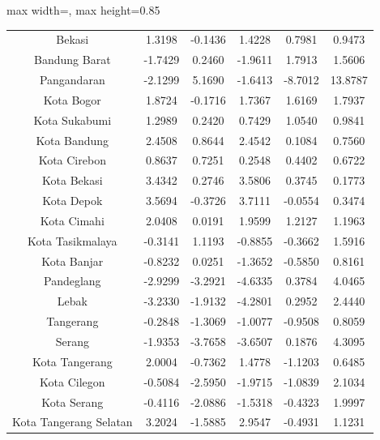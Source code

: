 \begin{table}[H]
\begin{adjustbox}{max width=\textwidth, max height=0.85\textheight}
\begin{tabular}{|c|c|c|c|c|c|}
Bekasi & 1.3198 & -0.1436 & 1.4228 & 0.7981 & 0.9473 \\
Bandung Barat & -1.7429 & 0.2460 & -1.9611 & 1.7913 & 1.5606 \\
Pangandaran & -2.1299 & 5.1690 & -1.6413 & -8.7012 & 13.8787 \\
Kota Bogor & 1.8724 & -0.1716 & 1.7367 & 1.6169 & 1.7937 \\
Kota Sukabumi & 1.2989 & 0.2420 & 0.7429 & 1.0540 & 0.9841 \\
Kota Bandung & 2.4508 & 0.8644 & 2.4542 & 0.1084 & 0.7560 \\
Kota Cirebon & 0.8637 & 0.7251 & 0.2548 & 0.4402 & 0.6722 \\
Kota Bekasi & 3.4342 & 0.2746 & 3.5806 & 0.3745 & 0.1773 \\
Kota Depok & 3.5694 & -0.3726 & 3.7111 & -0.0554 & 0.3474 \\
Kota Cimahi & 2.0408 & 0.0191 & 1.9599 & 1.2127 & 1.1963 \\
Kota Tasikmalaya & -0.3141 & 1.1193 & -0.8855 & -0.3662 & 1.5916 \\
Kota Banjar & -0.8232 & 0.0251 & -1.3652 & -0.5850 & 0.8161 \\
Pandeglang & -2.9299 & -3.2921 & -4.6335 & 0.3784 & 4.0465 \\
Lebak & -3.2330 & -1.9132 & -4.2801 & 0.2952 & 2.4440 \\
Tangerang & -0.2848 & -1.3069 & -1.0077 & -0.9508 & 0.8059 \\
Serang & -1.9353 & -3.7658 & -3.6507 & 0.1876 & 4.3095 \\
Kota Tangerang & 2.0004 & -0.7362 & 1.4778 & -1.1203 & 0.6485 \\
Kota Cilegon & -0.5084 & -2.5950 & -1.9715 & -1.0839 & 2.1034 \\
Kota Serang & -0.4116 & -2.0886 & -1.5318 & -0.4323 & 1.9997 \\
Kota Tangerang Selatan & 3.2024 & -1.5885 & 2.9547 & -0.4931 & 1.1231 \\
\hline
\end{tabular}
\end{adjustbox}
\end{table}